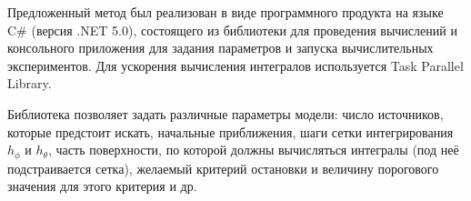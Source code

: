 Предложенный метод был реализован в виде программного продукта на языке C\# (версия .NET 5.0), состоящего из библиотеки для проведения вычислений и консольного приложения для задания параметров и запуска вычислительных экспериментов. Для ускорения вычисления интегралов используется Task Parallel Library.

Библиотека позволяет задать различные параметры модели: число источников, которые предстоит искать, начальные приближения, шаги сетки интегрирования $h_\phi$ и $h_\theta$, часть поверхности, по которой должны вычисляться интегралы (под неё подстраивается сетка), желаемый критерий остановки и величину порогового значения для этого критерия и др.
